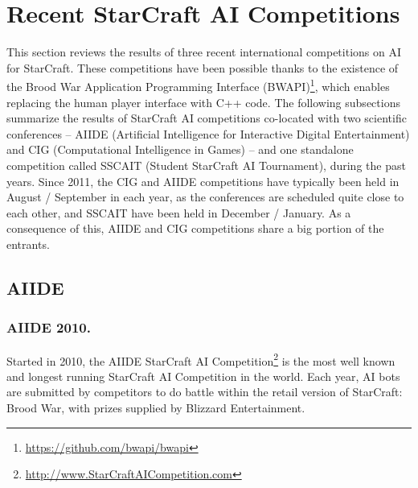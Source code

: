 \documentclass{llncs}
\begin{document}
\section*{Recent StarCraft AI Competitions}\label{sec:competition}

This section reviews the results of three recent international competitions on AI for StarCraft. These competitions
have been possible thanks to the existence of the Brood War Application Programming Interface 
(BWAPI)\footnote{\url{https://github.com/bwapi/bwapi}}, which 
enables replacing the human player interface with C++ code.
The following subsections summarize the results of StarCraft AI competitions co-located with two scientific conferences -- AIIDE (Artificial Intelligence for Interactive Digital Entertainment) and CIG (Computational Intelligence in Games) -- and one stand\-alone competition called SSCAIT (Student StarCraft AI Tournament), during the past years. Since 2011, the CIG and AIIDE competitions have typically been held in August / September in each year, as the conferences are scheduled quite close to each other, and SSCAIT have been held in December / January. As a consequence of this, AIIDE and CIG competitions share a big portion of the entrants.


\subsection*{AIIDE}\label{sec:AIIDE}

\subsubsection*{AIIDE 2010.}

Started in 2010, the AIIDE StarCraft AI Competition\footnote{\url{http://www.StarCraftAICompetition.com}} is the most
well known and longest running StarCraft AI Competition in the world. Each year,
AI bots are submitted by competitors to do battle within the retail version of
StarCraft: Brood War, with prizes supplied by Blizzard Entertainment. %
\end{document}
